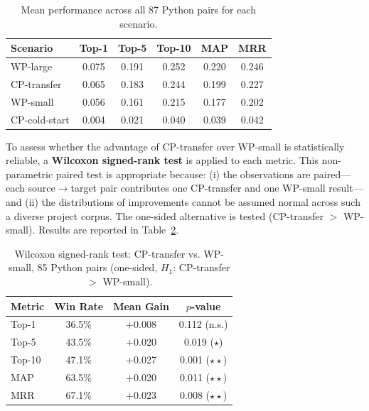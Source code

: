 \documentclass[12pt,table,xcdraw]{article}
\begin{document}
\begin{table}[h]
\centering
\caption{Mean performance across all 87 Python pairs for each scenario.}
\label{tab:overall}
\begin{tabular}{|l|c|c|c|c|c|}
\hline
\textbf{Scenario} & \textbf{Top-1} & \textbf{Top-5} & \textbf{Top-10} & \textbf{MAP} & \textbf{MRR} \\ \hline
WP-large      & 0.075 & 0.191 & 0.252 & 0.220 & 0.246 \\ \hline
CP-transfer   & 0.065 & 0.183 & 0.244 & 0.199 & 0.227 \\ \hline
WP-small      & 0.056 & 0.161 & 0.215 & 0.177 & 0.202 \\ \hline
CP-cold-start & 0.004 & 0.021 & 0.040 & 0.039 & 0.042 \\ \hline
\end{tabular}
\end{table}

To assess whether the advantage of CP-transfer over WP-small is statistically reliable, a \textbf{Wilcoxon signed-rank test} is applied to each metric. This non-parametric paired test is appropriate because: (i) the observations are paired---each source$\rightarrow$target pair contributes one CP-transfer and one WP-small result---and (ii) the distributions of improvements cannot be assumed normal across such a diverse project corpus. The one-sided alternative is tested (CP-transfer $>$ WP-small). Results are reported in Table~\ref{tab:wilcoxon}.

\begin{table}[h]
\centering
\caption{Wilcoxon signed-rank test: CP-transfer vs. WP-small, 85 Python pairs (one-sided, $H_1$: CP-transfer $>$ WP-small).}
\label{tab:wilcoxon}
\begin{tabular}{|l|c|c|c|}
\hline
\textbf{Metric} & \textbf{Win Rate} & \textbf{Mean Gain} & \textbf{$p$-value} \\ \hline
Top-1  & 36.5\% & +0.008 & 0.112 (n.s.) \\ \hline
Top-5  & 43.5\% & +0.020 & 0.019 ($\star$) \\ \hline
Top-10 & 47.1\% & +0.027 & 0.001 ($\star\star$) \\ \hline
MAP    & 63.5\% & +0.020 & 0.011 ($\star\star$) \\ \hline
MRR    & 67.1\% & +0.023 & 0.008 ($\star\star$) \\ \hline
\end{tabular}
\end{table}
\end{document}

